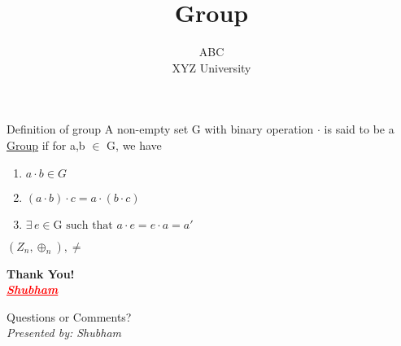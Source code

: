 \documentclass{beamer}
\title{Group}
\author{ABC\\ XYZ University}
\date{}
\begin{document}
\begin{frame}
\maketitle
\end{frame}

\begin{frame}{Definition of group}
A non-empty set G with binary operation $\cdot$ is said to be a \underline{Group} if for a,b $\in$ G, we have \\
\begin{enumerate}
\item $ a \cdot b \in  G  $
\item $ (a \cdot b ) \cdot c = a \cdot ( b \cdot c)$
\item $\exists\, e \in \text{G such that}\,\, a \cdot e = e \cdot a = a'    $

\end{enumerate}
$(Z_n,\oplus_n),  \neq$
\lipsum[1]  %


\end{frame}

\begin{frame}[plain]
  \centering
  \vspace{2cm}
  {\Huge\bfseries Thank You!} \\[1cm]
 {\Large\textcolor{red}{\textbf{\emph{\underline{Shubham}}}}}


  {\large Questions or Comments?} \\[1cm]
  {\small \textit{Presented by: Shubham}} %
\end{frame}
\end{document}
